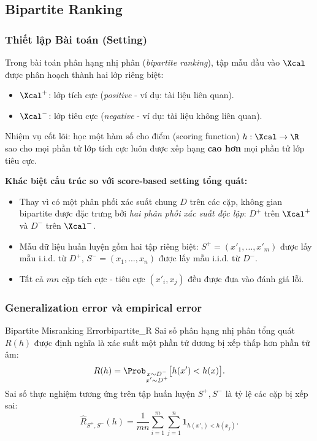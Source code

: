 \subsection{Bipartite Ranking}
\label{sec:bipartite}

\subsubsection{Thiết lập Bài toán (Setting)}

Trong bài toán phân hạng nhị phân (\textit{bipartite ranking}), tập mẫu đầu vào $\Xcal$ được phân hoạch thành hai lớp riêng biệt:
\begin{itemize}
    \item $\Xcal^+$: lớp tích cực (\textit{positive} - ví dụ: tài liệu liên quan).
    \item $\Xcal^-$: lớp tiêu cực (\textit{negative} - ví dụ: tài liệu không liên quan).
\end{itemize}
Nhiệm vụ cốt lõi: học một hàm số cho điểm (scoring function) $h: \Xcal \to \R$ sao cho mọi phần tử lớp tích cực luôn được xếp hạng \textbf{cao hơn} mọi phần tử lớp tiêu cực.

\textbf{Khác biệt cấu trúc so với score-based setting tổng quát:}
\begin{itemize}
    \item Thay vì có một phân phối xác suất chung $D$ trên các cặp, không gian bipartite được đặc trưng bởi \textit{hai phân phối xác suất độc lập}: $D^+$ trên $\Xcal^+$ và $D^-$ trên $\Xcal^-$.
    \item Mẫu dữ liệu huấn luyện gồm hai tập riêng biệt:
          $S^+ = (x'_1, \ldots, x'_m)$ được lấy mẫu i.i.d. từ $D^+$,
          $S^- = (x_1, \ldots, x_n)$ được lấy mẫu i.i.d. từ $D^-$.
    \item Tất cả $mn$ cặp tích cực - tiêu cực $(x'_i, x_j)$ đều được đưa vào đánh giá lỗi.
\end{itemize}

\subsubsection{Generalization error và empirical error}

\begin{definition}{Bipartite Misranking Error}{bipartite_R}
Sai số phân hạng nhị phân tổng quát $R(h)$ được định nghĩa là xác suất một phần tử dương bị xếp thấp hơn phần tử âm:
\begin{equation}
    R(h) = \Prob_{\substack{x \sim D^- \\ x' \sim D^+}}\bigl[h(x') < h(x)\bigr].
    \label{eq:R_bipartite}
\end{equation}
Sai số thực nghiệm tương ứng trên tập huấn luyện $S^+, S^-$ là tỷ lệ các cặp bị xếp sai:
\begin{equation}
    \hat{R}_{S^+, S^-}(h) = \frac{1}{mn} \sum_{i=1}^m \sum_{j=1}^n \mathbf{1}_{h(x'_i) < h(x_j)}.
    \label{eq:R_emp_bipartite}
\end{equation}
\end{definition}

